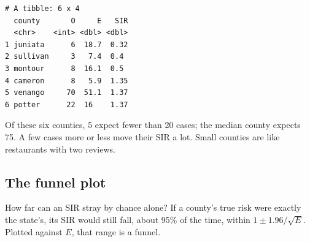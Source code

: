 \documentclass[
  letterpaper,
  DIV=11,
  numbers=noendperiod]{scrartcl}
\begin{document}
\begin{verbatim}
# A tibble: 6 x 4
  county       O     E   SIR
  <chr>    <int> <dbl> <dbl>
1 juniata      6  18.7  0.32
2 sullivan     3   7.4  0.4 
3 montour      8  16.1  0.5 
4 cameron      8   5.9  1.35
5 venango     70  51.1  1.37
6 potter      22  16    1.37
\end{verbatim}

Of these six counties, 5 expect fewer than 20 cases; the median county
expects 75. A few cases more or less move their SIR a lot. Small
counties are like restaurants with two reviews.

\subsection{The funnel plot}\label{the-funnel-plot}

How far can an SIR stray by chance alone? If a county's true risk were
exactly the state's, its SIR would still fall, about 95\% of the time,
within \(1 \pm 1.96/\sqrt{E}\). Plotted against \(E\), that range is a
funnel.
\end{document}
